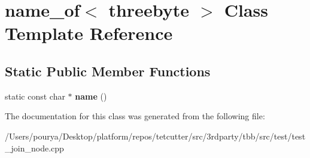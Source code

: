 \hypertarget{classname__of_3_01threebyte_01_4}{}\section{name\+\_\+of$<$ threebyte $>$ Class Template Reference}
\label{classname__of_3_01threebyte_01_4}
\subsection*{Static Public Member Functions}
\begin{DoxyCompactItemize}
\item 
\hypertarget{classname__of_3_01threebyte_01_4_a5b86b6cbbe397a38e2d419bb7884370e}{}static const char $\ast$ {\bfseries name} ()\label{classname__of_3_01threebyte_01_4_a5b86b6cbbe397a38e2d419bb7884370e}

\end{DoxyCompactItemize}


The documentation for this class was generated from the following file\+:\begin{DoxyCompactItemize}
\item 
/\+Users/pourya/\+Desktop/platform/repos/tetcutter/src/3rdparty/tbb/src/test/test\+\_\+join\+\_\+node.\+cpp\end{DoxyCompactItemize}
